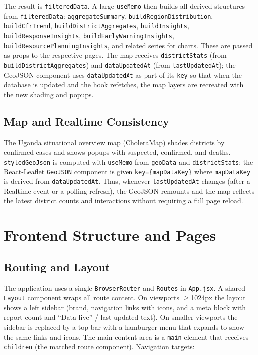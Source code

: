 \documentclass[11pt,a4paper]{article}
\begin{document}
The result is \texttt{filteredData}. A large \texttt{useMemo} then builds all derived structures from \texttt{filteredData}: \texttt{aggregateSummary}, \texttt{buildRegionDistribution}, \texttt{buildCfrTrend}, \texttt{buildDistrictAggregates}, \texttt{buildInsights}, \texttt{buildResponseInsights}, \texttt{buildEarlyWarningInsights}, \texttt{buildResourcePlanningInsights}, and related series for charts. These are passed as props to the respective pages. The map receives \texttt{districtStats} (from \texttt{buildDistrictAggregates}) and \texttt{dataUpdatedAt} (from \texttt{lastUpdatedAt}); the GeoJSON component uses \texttt{dataUpdatedAt} as part of its \texttt{key} so that when the database is updated and the hook refetches, the map layers are recreated with the new shading and popups.

\subsection{Map and Realtime Consistency}

The Uganda situational overview map (CholeraMap) shades districts by confirmed cases and shows popups with suspected, confirmed, and deaths. \texttt{styledGeoJson} is computed with \texttt{useMemo} from \texttt{geoData} and \texttt{districtStats}; the React-Leaflet \texttt{GeoJSON} component is given \texttt{key=\{mapDataKey\}} where \texttt{mapDataKey} is derived from \texttt{dataUpdatedAt}. Thus, whenever \texttt{lastUpdatedAt} changes (after a Realtime event or a polling refresh), the GeoJSON remounts and the map reflects the latest district counts and interactions without requiring a full page reload.

\newpage

\section{Frontend Structure and Pages}

\subsection{Routing and Layout}

The application uses a single \texttt{BrowserRouter} and \texttt{Routes} in \texttt{App.jsx}. A shared \texttt{Layout} component wraps all route content. On viewports $\geq$1024px the layout shows a left sidebar (brand, navigation links with icons, and a meta block with report count and ``Data live'' / last-updated text). On smaller viewports the sidebar is replaced by a top bar with a hamburger menu that expands to show the same links and icons. The main content area is a \texttt{main} element that receives \texttt{children} (the matched route component). Navigation targets:
\end{document}
